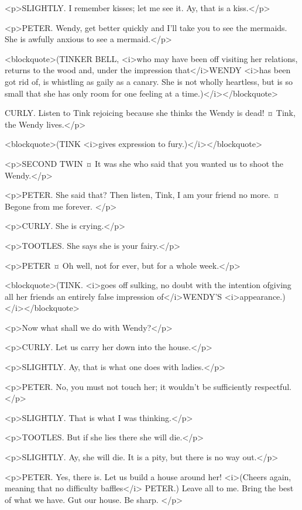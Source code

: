 <p>SLIGHTLY. I remember kisses; let me see it.
Ay, that is a kiss.</p>

<p>PETER. Wendy, get better quickly and I'll take you to see the mermaids. She is awfully anxious to see a mermaid.</p>

<blockquote>(TINKER BELL, <i>who may have been off visiting her relations, returns to the wood and, under the impression that</i>WENDY <i>has been got rid of, is whistling as gaily as a canary. She is not wholly heartless, but is so small that she has only room for one feeling at a time.)</i></blockquote>

CURLY. Listen to Tink rejoicing because she thinks the Wendy is dead!
¤
Tink, the Wendy lives.</p>

<blockquote>(TINK <i>gives expression to fury.)</i></blockquote>

<p>SECOND TWIN ¤
It was she who said that you wanted us to shoot the Wendy.</p>

<p>PETER. She said that? Then listen, Tink, I am your friend no more.
¤
Begone from me forever.
</p>

<p>CURLY. She is crying.</p>

<p>TOOTLES. She says she is your fairy.</p>

<p>PETER ¤
Oh well, not for ever, but for a whole week.</p>

<blockquote>(TINK. <i>goes off sulking, no doubt with the intention ofgiving all her friends an entirely false impression of</i>WENDY'S <i>appearance.)</i></blockquote>

<p>Now what shall we do with Wendy?</p>

<p>CURLY. Let us carry her down into the house.</p>

<p>SLIGHTLY. Ay, that is what one does with ladies.</p>

<p>PETER. No, you must not touch her; it wouldn't be sufficiently respectful.</p>

<p>SLIGHTLY. That is what I was thinking.</p>

<p>TOOTLES. But if she lies there she will die.</p>

<p>SLIGHTLY. Ay, she will die. It is a pity, but there is no way out.</p>

<p>PETER. Yes, there is. Let us build a house around her! <i>(Cheers again, meaning that no difficulty baffles</i> PETER.) Leave all to me. Bring the best of what we have. Gut our house. Be sharp.
</p>

